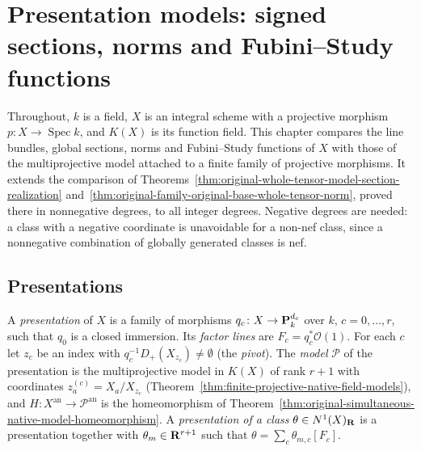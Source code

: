 \section{Presentation models: signed sections, norms and Fubini--Study functions}
\label{sec:source-presentation-models}

Throughout, $k$ is a field, $X$ is an integral scheme with a projective morphism
$p\colon X\to\operatorname{Spec}k$, and $K(X)$ is its function field. This chapter compares
the line bundles, global sections, norms and Fubini--Study functions of $X$ with those of the
multiprojective model attached to a finite family of projective morphisms. It extends the
comparison of Theorems~\ref{thm:original-whole-tensor-model-section-realization}
and~\ref{thm:original-family-original-base-whole-tensor-norm}, proved there in nonnegative
degrees, to all integer degrees. Negative degrees are needed: a class with a negative coordinate
is unavoidable for a non-nef class, since a nonnegative combination of globally generated
classes is nef.

\subsection{Presentations}

\begin{definition}[Presentations]
\label{def:pm-presentation}
\leanok
{}
A \emph{presentation} of $X$ is a family of morphisms $q_c\colon X\to\mathbf{P}^{d_c}_k$ over $k$,
$c=0,\dots,r$, such that $q_0$ is a closed immersion. Its \emph{factor lines} are
$F_c=q_c^*\mathcal O(1)$. For each $c$ let $z_c$ be an index with $q_c^{-1}D_+(X_{z_c})\neq
\emptyset$ (the \emph{pivot}). The \emph{model} $\mathcal P$ of the presentation is the
multiprojective model in $K(X)$ of rank $r+1$ with coordinates $z^{(c)}_a=X_a/X_{z_c}$
(Theorem~\ref{thm:finite-projective-native-field-models}), and
$H\colon X^{\mathrm{an}}\to\mathcal P^{\mathrm{an}}$ is the homeomorphism of
Theorem~\ref{thm:original-simultaneous-native-model-homeomorphism}. A \emph{presentation of a
class} $\theta\in N^1(X)_{\mathbf{R}}$ is a presentation together with $\theta_m\in\mathbf{R}^{r+1}$ such that
$\theta=\sum_c\theta_{m,c}[F_c]$.
\end{definition}

